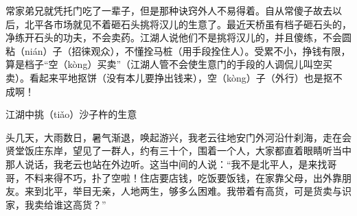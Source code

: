 \documentclass[12pt,UTF8]{ctexbook}
\begin{document}
常家弟兄就凭托门吃了一辈子，但是那种诀窍外人不易得着。自从常傻子故去以后，北平各市场就见不着砸石头挑将汉儿的生意了。最近天桥虽有档子砸石头的，净练开石头的功夫，不会卖药。江湖人说他们不是挑将汉儿的，并且傻练，不会圆粘（nián）子（招徕观众），不懂拴马桩（用手段拴住人）。受累不小，挣钱有限，算是档子“空（kòng）买卖”（江湖人管不会使生意门的手段的人调侃儿叫空买卖）。看起来平地抠饼（没有本儿要挣出钱来），空（kòng）子（外行）也是抠不成啊！





江湖中挑（tiǎo）沙子杵的生意


头几天，大雨数日，暑气渐退，唤起游兴，我老云往地安门外河沿什刹海，走在会贤堂饭庄东岸，望见了一群人，约有三十个，围着一个人，大家都直着眼睛听当中那人说话，我老云也站在外边听。这当中间的人说：“我不是北平人，是来找哥哥，不料来得不巧，扑了空啦！住店要店钱，吃饭要饭钱，在家靠父母，出外靠朋友。来到北平，举目无亲，人地两生，够多么困难。我带着有高货，可是货卖与识家，我卖给谁这高货？”
\end{document}
